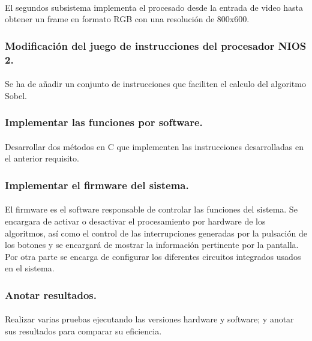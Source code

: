 \documentclass[a4paper,12pt,titlepage,final]{book}
\begin{document}
\paragraph{}
El segundos subsistema implementa el procesado desde la entrada de video hasta obtener un frame en formato RGB con una resolución de 800x600.

\subsubsection{Modificación del juego de instrucciones del procesador NIOS 2.}
\paragraph{}
Se ha de añadir un conjunto de instrucciones que faciliten el calculo del algoritmo Sobel.

\subsubsection{Implementar las funciones por software.}
\paragraph{}
Desarrollar dos métodos en C que implementen las instrucciones desarrolladas en el anterior requisito.

\subsubsection{Implementar el firmware del sistema.}
\paragraph{}
El firmware es el software responsable de controlar las funciones del sistema. Se encargara de activar o desactivar el procesamiento por hardware de los algoritmos, así como el control de las interrupciones generadas por la pulsación de los botones y se encargará de mostrar la información pertinente por la pantalla. Por otra parte se encarga de configurar los diferentes circuitos integrados usados en el sistema.

\subsubsection{Anotar resultados.}
\paragraph{}
Realizar varias pruebas ejecutando las versiones hardware y software; y anotar sus resultados para comparar su eficiencia.
\end{document}

